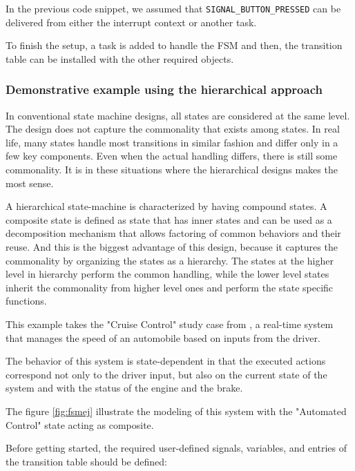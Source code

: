 

In the previous code snippet, we assumed that \lstinline{SIGNAL_BUTTON_PRESSED} can be delivered from either the interrupt context or another task.

To finish the setup, a task is added to handle the FSM and then, the transition table can be installed with the other required objects.
\medskip



\subsubsection{Demonstrative example using the hierarchical approach} 
In conventional state machine designs, all states are considered at the same level. The design does not capture the commonality that exists among states. In real life, many states handle most transitions in similar fashion and differ only in a few key components. Even when the actual handling differs, there is still some commonality. It is in these situations where the hierarchical designs makes the most sense.



A hierarchical state-machine is characterized by having compound states. A composite state is defined as state that has inner states and can be used as a decomposition mechanism that allows factoring of common behaviors and their reuse. And this is the biggest advantage of this design, because it captures the commonality by organizing the states as a hierarchy. The states at the higher level in hierarchy perform the common handling, while the lower level states inherit the commonality from higher level ones and perform the state specific functions.

This example takes the "Cruise Control" study case from \cite{gomaa}, a real-time system that manages the speed of an automobile based on inputs from the driver. 

The behavior of this system is state-dependent in that the executed actions correspond not only to the driver input, but also on the current state of the system and with the status of the engine and the brake. 

The figure \ref{fig:fsmej} illustrate the modeling of this system with the "Automated Control" state acting as composite.
\medskip

Before getting started, the required user-defined signals, variables, and entries of the transition table should be defined:
\medskip

